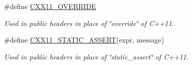 \begin{DoxyCompactItemize}
\#define \hyperlink{group__CXX11_ga227e03075b55f272574b1ce9ae454450}{C\+X\+X11\+\_\+\+O\+V\+E\+R\+R\+I\+DE}
\begin{DoxyCompactList}\small\item\em Used in public headers in place of \char`\"{}override\char`\"{} of C++11. \end{DoxyCompactList}\item 
\#define \hyperlink{group__CXX11_ga81dced8151aba09246e64f7f8e1ec9e4}{C\+X\+X11\+\_\+\+S\+T\+A\+T\+I\+C\+\_\+\+A\+S\+S\+E\+RT}(expr,  message)
\begin{DoxyCompactList}\small\item\em Used in public headers in place of \char`\"{}static\+\_\+assert\char`\"{} of C++11. \end{DoxyCompactList}\end{DoxyCompactItemize}


